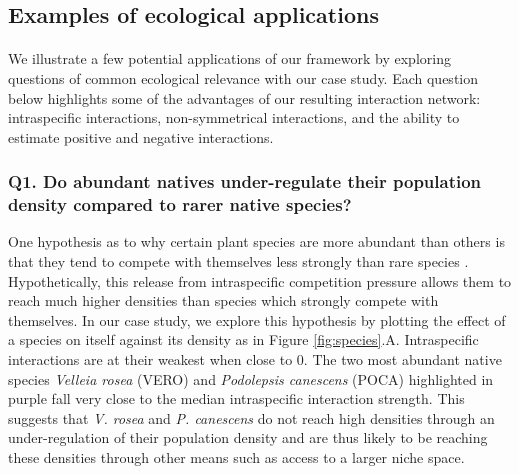\documentclass[a4,12pt]{article}
\begin{document}
\begin{refsection}
    \subsection{Examples of ecological applications}

    \paragraph{}
    We illustrate a few potential applications of our framework by exploring questions of common ecological relevance with our case study. Each question below highlights some of the advantages of our resulting interaction network: intraspecific interactions, non-symmetrical interactions, and the ability to estimate positive and negative interactions. 

    \subsubsection*{Q1. Do abundant natives under-regulate their population density compared to rarer native species?}
    One hypothesis as to why certain plant species are more abundant than others is that they tend to compete with themselves less strongly than rare species \parencite{Yenni2012, Yenni2017}. Hypothetically, this release from intraspecific competition pressure allows them to reach much higher densities than species which strongly compete with themselves. In our case study, we explore this hypothesis by plotting the effect of a species on itself against its density as in Figure \ref{fig:species}.A. Intraspecific interactions are at their weakest when close to $0$. The two most abundant native species \textit{Velleia rosea} (VERO) and \textit{Podolepsis canescens} (POCA) highlighted in purple fall very close to the median intraspecific interaction strength. This suggests that \textit{V. rosea} and \textit{P. canescens} do not reach high densities through an under-regulation of their population density and are thus likely to be reaching these densities through other means such as access to a larger niche space. 


\end{refsection}
\end{document}
